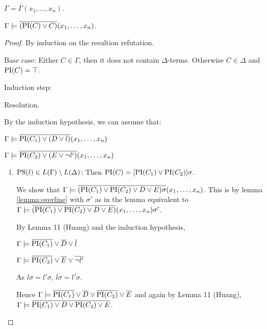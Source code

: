 	\begin{prop}
		$\Gamma = \overline{\Gamma}(x_1, \ldots, x_n)$.
	\end{prop}

	\begin{thm} $ \Gamma \models \overline{(\mathrm{PI}(C) \lor C)}(x_1, \ldots, x_n) $.
	\end{thm}

	\begin{proof}
	By induction on the resultion refutation.

	Base case:
	Either $C \in \Gamma$, then it does not contain $\Delta$-terms.
	Otherwise $C \in \Delta$ and $\mathrm{PI}(C) = \top$.

	Induction step:
	\begin{description}
		\item{Resolution.}
			\begin{prooftree}
			\end{prooftree}

			By the induction hypothesis, we can assume that:

			$\Gamma \models \overline{\mathrm{PI}(C_1) \lor (D\lor l)}(x_1, \ldots, x_n)$

			$\Gamma \models \overline{\mathrm{PI}(C_2) \lor (E\lor \lnot l')}(x_{1}, \ldots, x_n)$

			\begin{enumerate}
				\item $\mathrm{PS}(l) \in L(\Gamma) \setminus L(\Delta)$:
					Then $\mathrm{PI}(C) = [\mathrm{PI}(C_1) \lor \mathrm{PI}(C_2)]\sigma$. 

					We show that $\Gamma \models \overline{(\mathrm{PI}(C_1) \lor \mathrm{PI}(C_2) \lor D \lor E)\sigma}(x_1, \ldots, x_n) $.
					This is by lemma \ref{lemma:overline} with $\sigma'$ as in the lemma equivalent to
					$\Gamma \models \overline{(\mathrm{PI}(C_1) \lor \mathrm{PI}(C_2) \lor D \lor E)}(x_1, \ldots, x_n)\sigma' $.

					By Lemma 11 (Huang) and the induction hypothesis,

					$\Gamma \models \overline{\mathrm{PI}(C_1)} \lor \overline{D} \lor \overline l$

					$\Gamma \models \overline{\mathrm{PI}(C_2)} \lor \overline{E} \lor \overline{\lnot l'}$

					As $l\sigma = l'\sigma$, $\overline{l\sigma} = \overline{l'\sigma}$.

					Hence $\Gamma \models \overline{\mathrm{PI}(C_1)} \lor \overline{D} \lor \overline{\mathrm{PI}(C_2)} \lor \overline{E}$
					and again by Lemma 11 (Huang), 
					$\Gamma \models \overline{\mathrm{PI}(C_1) \lor D \lor \mathrm{PI}(C_2) \lor E}$.


\end{enumerate}
\end{description}
\end{proof}
